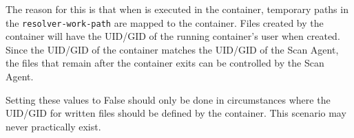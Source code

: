 The reason for this is that when \scaresolver is executed in the container, temporary paths
in the \texttt{resolver-work-path} are mapped to the container.  Files created by the container
will have the UID/GID of the running container's user when created.  Since the UID/GID of the
container matches the UID/GID of the Scan Agent, the files that remain after
the container exits can be controlled by the Scan Agent.

Setting these values to False should only be done in circumstances where the UID/GID for written files
should be defined by the container.  This scenario may never practically exist.

